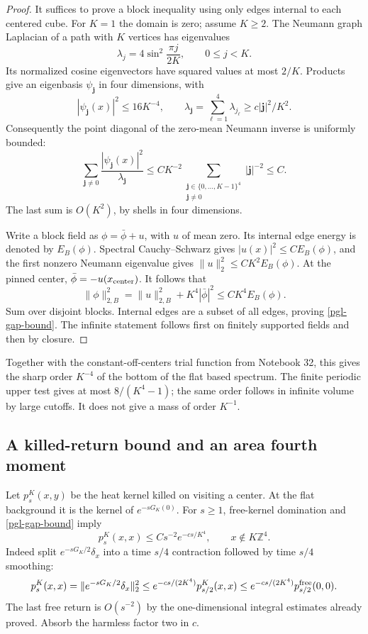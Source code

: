 \begin{proof}
It suffices to prove a block inequality using only
edges internal to each centered cube. For \(K=1\)
the domain is zero; assume \(K\ge2\).
The Neumann graph Laplacian of a path with \(K\)
vertices has eigenvalues
\[
 \lambda_j=4\sin^2\frac{\pi j}{2K},\qquad
                  0\le j<K.
\]
Its normalized cosine eigenvectors have squared
values at most \(2/K\). Products give an eigenbasis
\(\psi_{\boldsymbol j}\) in four dimensions, with
\[
 |\psi_{\boldsymbol j}(x)|^2\le16K^{-4},\qquad
 \lambda_{\boldsymbol j}
       =\sum_{\ell=1}^4\lambda_{j_\ell}
                          \ge c|\boldsymbol j|^2/K^2.
\]
Consequently the point diagonal of the zero-mean
Neumann inverse is uniformly bounded:
\[
 \sum_{\boldsymbol j\ne0}
       \frac{|\psi_{\boldsymbol j}(x)|^2}
            {\lambda_{\boldsymbol j}}
 \le CK^{-2}
       \sum_{\substack{\boldsymbol j\in\{0,\ldots,K-1\}^4\\
                        \boldsymbol j\ne0}}
                              |\boldsymbol j|^{-2}\le C.
\]
The last sum is \(O(K^2)\), by shells in four dimensions.

Write a block field as \(\phi=\bar\phi+u\), with
\(u\) of mean zero. Its internal edge energy is
denoted by \(E_B(\phi)\). Spectral Cauchy--Schwarz
gives \(|u(x)|^2\le C E_B(\phi)\), and the first
nonzero Neumann eigenvalue gives
\(\|u\|_2^2\le CK^2 E_B(\phi)\).
At the pinned center, \(\bar\phi=-u(x_{\rm center})\).
It follows that
\[
 \|\phi\|_{2,B}^2=\|u\|_{2,B}^2+K^4|\bar\phi|^2
                                  \le CK^4 E_B(\phi).
\]
Sum over disjoint blocks. Internal edges are a
subset of all edges, proving \eqref{pgl-gap-bound}.
The infinite statement follows first on finitely
supported fields and then by closure.
\end{proof}

Together with the constant-off-centers trial function
from Notebook 32, this gives the sharp order \(K^{-4}\)
of the bottom of the flat based spectrum. The finite
periodic upper test gives at most \(8/(K^4-1)\);
the same order follows in infinite volume by large
cutoffs. It does not give a mass of order \(K^{-1}\).

\subsection{A killed-return bound and an area fourth moment}
\label{pgl-tail-inputs-section}

Let \(p_s^K(x,y)\) be the heat kernel killed on visiting
a center. At the flat background it is the kernel of
\(e^{-sG_K(0)}\). For \(s\ge1\), free-kernel domination
and \eqref{pgl-gap-bound} imply
\begin{equation}
 p_s^K(x,x)\le Cs^{-2}e^{-c s/K^4},
                         \qquad x\notin K\mathbb Z^4.
 \label{pgl-killed-return}
\end{equation}
Indeed split \(e^{-sG_K/2}\delta_x\) into a time
\(s/4\) contraction followed by time \(s/4\)
smoothing:
\[
 p_s^K(x,x)
 =\|e^{-sG_K/2}\delta_x\|_2^2
 \le e^{-c s/(2K^4)}p_{s/2}^K(x,x)
 \le e^{-c s/(2K^4)}p_{s/2}^{\rm free}(0,0).
\]
The last free return is \(O(s^{-2})\) by the
one-dimensional integral estimates already proved.
Absorb the harmless factor two in \(c\).

